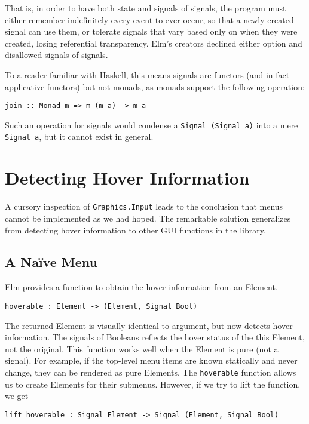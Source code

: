 \documentclass{article}
\begin{document}
That is, in order to have both state and signals of signals, the program
must either remember indefinitely every event to ever occur, so that a
newly created signal can use them, or tolerate signals that vary based
only on when they were created, losing referential transparency. Elm's
creators declined either option and disallowed signals of signals.

To a reader familiar with Haskell, this means signals are functors (and
in fact applicative functors) but not monads, as monads support the
following operation:

\begin{verbatim}
join :: Monad m => m (m a) -> m a
\end{verbatim}

Such an operation for signals would condense a
\texttt{Signal (Signal a)} into a mere \texttt{Signal a}, but it cannot
exist in general.

\section{Detecting Hover Information}\label{detecting-hover-information}
A cursory inspection of \texttt{Graphics.Input} leads to the conclusion that
menus cannot be implemented as we had hoped. The remarkable solution generalizes
from detecting hover information to other GUI functions in the library.

\subsection{A Na\"{i}ve Menu}\label{a-naive-menu}

Elm provides a function to obtain the hover information from an Element.

\texttt{hoverable : Element -\textgreater{} (Element, Signal Bool)}

The returned Element is visually identical to argument, but now detects
hover information. The signals of Booleans reflects the hover status of
the this Element, not the original. This function works well when the
Element is pure (not a signal). For example, if the top-level menu items are
known statically and never change, they can be rendered as pure Elements. The
\texttt{hoverable} function allows us to create Elements for their submenus.
However, if we try to lift the function, we get

\texttt{lift hoverable : Signal Element -\textgreater{} Signal (Element, Signal Bool)}
\end{document}
